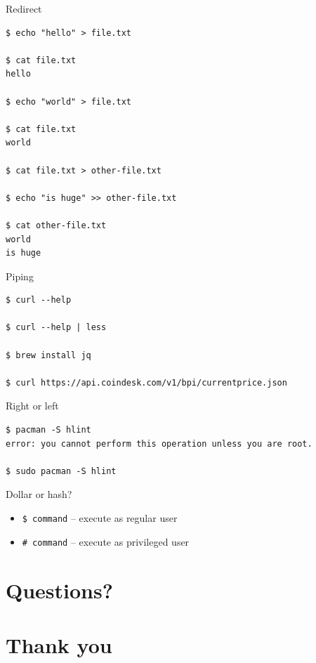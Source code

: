 \documentclass[presentation,aspectratio=169,smaller]{beamer}
\begin{document}
\begin{frame}[label={sec:orgd5be66e},fragile]{Redirect}
 \begin{verbatim}
$ echo "hello" > file.txt

$ cat file.txt
hello

$ echo "world" > file.txt

$ cat file.txt
world

$ cat file.txt > other-file.txt

$ echo "is huge" >> other-file.txt

$ cat other-file.txt
world
is huge
\end{verbatim}
\end{frame}

\begin{frame}[label={sec:org185c4e6},fragile]{Piping}
 \begin{verbatim}
$ curl --help

$ curl --help | less

$ brew install jq

$ curl https://api.coindesk.com/v1/bpi/currentprice.json
\end{verbatim}
\end{frame}

\begin{frame}[label={sec:org9ffea63},fragile]{Right or left}
 \begin{verbatim}
$ pacman -S hlint
error: you cannot perform this operation unless you are root.

$ sudo pacman -S hlint
\end{verbatim}
\end{frame}

\begin{frame}[label={sec:orgf119221},fragile]{Dollar or hash?}
 \begin{itemize}
\item \texttt{\$ command} -- execute as regular user
\item \texttt{\# command} -- execute as privileged user
\end{itemize}
\end{frame}
\section{Questions?}
\label{sec:org682f48c}
\section{Thank you}
\label{sec:orgaf4c8f0}
\end{document}
